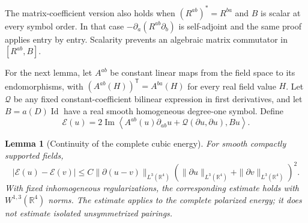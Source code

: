 \documentclass[11pt,a4paper]{article}
\numberwithin{equation}{section}
\newcommand{\Id}{\operatorname{Id}}
\newcommand{\R}{\mathbb R}
\renewcommand{\Im}{\operatorname{Im}}
\newtheorem{lemma}[theorem]{Lemma}
\theoremstyle{definition}
\begin{document}
The matrix-coefficient version also holds when
$(R^{ab})^*=R^{ba}$ and $B$ is scalar at every symbol order. In that case
$-\partial_a(R^{ab}\partial_b)$ is self-adjoint and the same proof
applies entry by entry. Scalarity prevents an algebraic matrix
commutator in $[R^{ab},B]$.

For the next lemma, let $A^{ab}$ be constant linear maps from the field
space to its endomorphisms, with
$(A^{ab}(H))^{\mathsf T}=A^{ba}(H)$ for every real field value $H$.
Let $\mathcal Q$ be any fixed constant-coefficient bilinear expression
in first derivatives, and let $B=a(D)\Id$ have a real smooth homogeneous
degree-one symbol. Define
\begin{equation*}
\mathcal E(u)=2\Im\left\langle
A^{ab}(u)\partial_{ab}u+\mathcal Q(\partial u,\partial u),Bu
\right\rangle.
\end{equation*}

\begin{lemma}[Continuity of the complete cubic energy]\label{lem:cubic-continuity}
For smooth compactly supported fields,
\begin{equation}\label{eq:cubic-continuity}
|\mathcal E(u)-\mathcal E(v)|
\leq C\|\partial(u-v)\|_{L^3(\R^4)}
(\|\partial u\|_{L^3(\R^4)}+\|\partial v\|_{L^3(\R^4)})^2.
\end{equation}
With fixed inhomogeneous regularizations, the corresponding estimate
holds with $W^{1,3}(\R^4)$ norms. The estimate applies to the complete
polarized energy; it does not estimate isolated unsymmetrized pairings.
\end{lemma}
\end{document}
